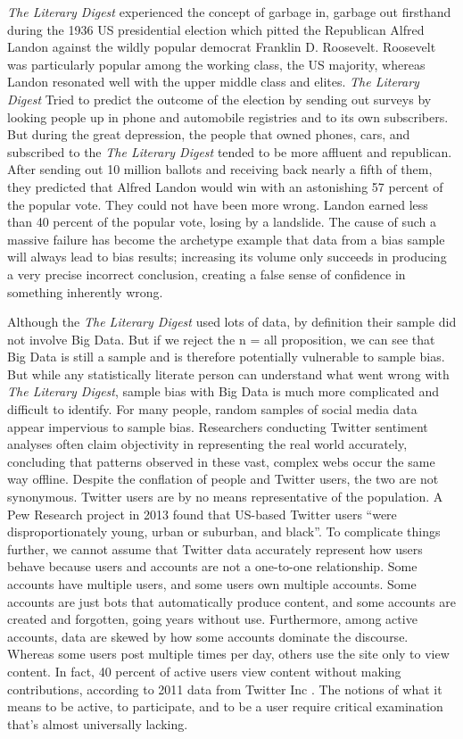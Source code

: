 \documentclass[sigconf]{acmart}
\begin{document}
{\em The Literary Digest} experienced the concept of garbage in, garbage out firsthand during the 1936 US presidential election which pitted the Republican Alfred Landon against the wildly popular democrat Franklin D. Roosevelt. Roosevelt was particularly popular among the working class, the US majority, whereas Landon resonated well with the upper middle class and elites\cite{Harford2014}. {\em The Literary Digest} Tried to predict the outcome of the election by sending out surveys by looking people up in phone and automobile registries and to its own subscribers. But during the great depression, the people that owned phones, cars, and subscribed to the  {\em The Literary Digest} tended to be more affluent and republican. After sending out 10 million ballots and receiving back nearly a fifth of them, they predicted that Alfred Landon would win with an astonishing 57 percent of the popular vote. They could not have been more wrong. Landon earned less than 40 percent of the popular vote, losing by a landslide\cite{Crossen2006}. The cause of such a massive failure has become the archetype example that data from a bias sample will always lead to bias results; increasing its volume only succeeds in producing a very precise incorrect conclusion, creating a false sense of confidence in something inherently wrong.

Although the {\em The Literary Digest} used lots of data, by definition their sample did not involve Big Data. But if we reject the n = all proposition, we can see that Big Data is still a sample and is therefore potentially vulnerable to sample bias. But while any statistically literate person can understand what went wrong with {\em The Literary Digest}, sample bias with Big Data is much more complicated and difficult to identify. For many people, random samples of social media data appear impervious to sample bias. Researchers conducting Twitter sentiment analyses often claim objectivity in representing the real world accurately, concluding that patterns observed in these vast, complex webs occur the same way offline. Despite the conflation of people and Twitter users, the two are not synonymous. Twitter users are by no means representative of the population. A Pew Research project in 2013 found that US-based Twitter users ``were disproportionately young, urban or suburban, and black''\cite{Boyd-Crawford2011}. To complicate things further, we cannot assume that Twitter data accurately represent how users behave because users and accounts are not a one-to-one relationship. Some accounts have multiple users, and some users own multiple accounts. Some accounts are just bots that automatically produce content, and some accounts are created and forgotten, going years without use. Furthermore, among active accounts, data are skewed by how some accounts dominate the discourse. Whereas some users post multiple times per day, others use the site only to view content. In fact, 40 percent of active users view content without making contributions, according to 2011 data from Twitter Inc \cite{Boyd-Crawford2011}. The notions of what it means to be active, to participate, and to be a user require critical examination that's almost universally lacking.
\end{document}
